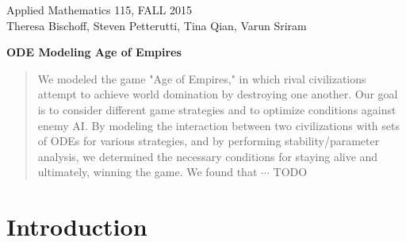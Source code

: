 \documentclass[12pt]{article}
\begin{document}
\begin{center}
Applied Mathematics 115, FALL 2015 \\


Theresa Bischoff, Steven Petterutti, Tina Qian, Varun Sriram

\medskip

\textbf{ODE Modeling Age of Empires}


\end{center}

\begin{abstract}
	We modeled the game "Age of Empires," in which rival civilizations attempt to achieve world domination by destroying one another. Our goal is to consider different game strategies and to optimize conditions against enemy AI. By modeling the interaction between two civilizations with sets of ODEs for various strategies, and by performing stability/parameter analysis, we determined the necessary conditions for staying alive and ultimately, winning the game. We found that $\cdots$ TODO
	
\end{abstract}

\section{Introduction}
\end{document}
